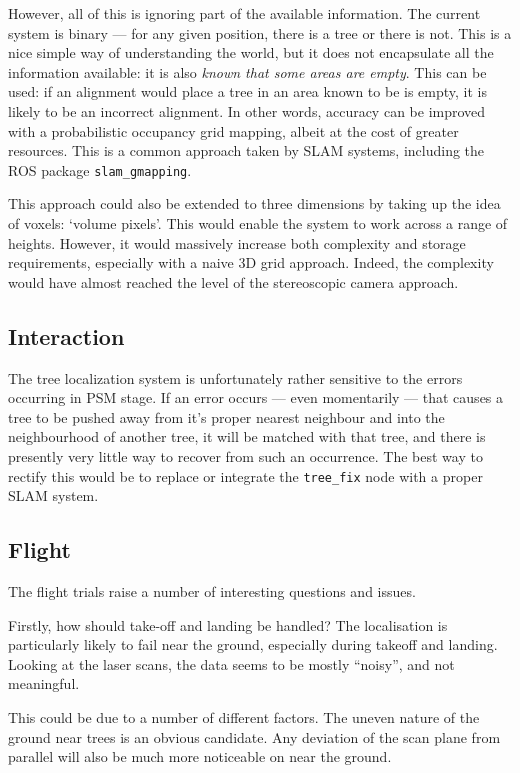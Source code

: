 \documentclass[12pt,oneside,a4paper]{book}
\begin{document}
However, all of this is ignoring part of the available
information. The current system is binary --- for any given position,
there is a tree or there is not. This is a nice simple way of
understanding the world, but it does not encapsulate all the
information available: it is also \emph{known that some areas are
  empty}. This can be used: if an alignment would place a tree in an
area known to be is empty, it is likely to be an incorrect
alignment. In other words, accuracy can be improved with a
probabilistic occupancy grid mapping, albeit at the cost of greater
resources. This is a common approach taken by SLAM systems, including
the ROS package \texttt{slam\_gmapping}.

This approach could also be extended to three dimensions by taking up
the idea of voxels: `volume pixels'. This would enable the system to
work across a range of heights. However, it would massively increase
both complexity and storage requirements, especially with a naive 3D
grid approach. Indeed, the complexity would have almost reached the
level of the stereoscopic camera approach.


\subsection{Interaction}
\label{sec:interaction}

The tree localization system is unfortunately rather sensitive to the
errors occurring in PSM stage. If an error occurs --- even momentarily
--- that causes a tree to be pushed away from it's proper nearest
neighbour and into the neighbourhood of another tree, it will be
matched with that tree, and there is presently very little way to
recover from such an occurrence. The best way to rectify this would be
to replace or integrate the \texttt{tree\_fix} node with a proper SLAM
system.

\subsection{Flight}
\label{sec:flight}

The flight trials raise a number of interesting questions and issues.

Firstly, how should take-off and landing be handled? The localisation
is particularly likely to fail near the ground, especially during
takeoff and landing. Looking at the laser scans, the data seems to be
mostly ``noisy'', and not meaningful.

This could be due to a number of different factors. The uneven nature
of the ground near trees is an obvious candidate. Any deviation of the
scan plane from parallel will also be much more noticeable on near the
ground.
\end{document}
